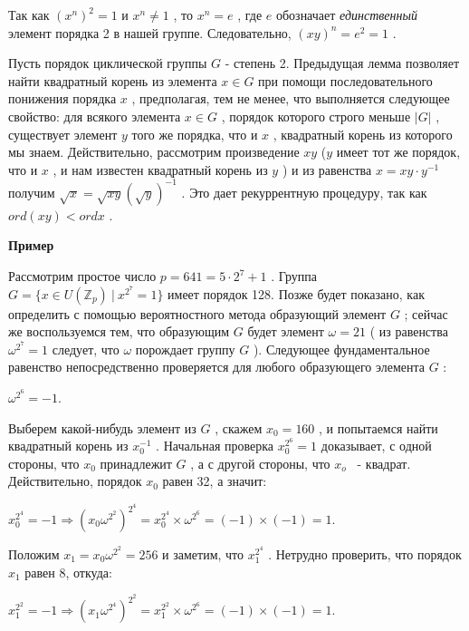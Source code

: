 \documentclass{mai_book}
\begin{document}
\begin{myproof}
Так как $(x^n)^2=1$
 и $x^n\not= 1$
 , то $x^n=e$
, где $e$
 обозначает {\it единственный} элемент порядка 2 в нашей группе. Следовательно, $(xy)^n=e^2=1$
 .
\end{myproof}

\newpage

Пусть порядок циклической группы $G$ - степень 2. Предыдущая лемма позволяет найти квадратный корень из элемента $x\in G$
 при помощи последовательного понижения порядка $x$
 , предполагая, тем не менее, что выполняется следующее свойство: для всякого элемента $x\in G$
, порядок которого строго меньше $|G|$
, существует элемент $y$
того же порядка, что и $x$
, квадратный корень из которого мы знаем. Действительно, рассмотрим произведение $xy$
 ($y$
 имеет тот же порядок, что и $x$
 , и нам известен квадратный корень из $y$
) и из равенства $x=xy\cdot y^{-1}$
 получим $\sqrt x = \sqrt{xy}(\sqrt y)^{-1}$
 . Это дает рекуррентную процедуру, так как $ord(xy)<ord x$
.


{\bf Пример}

Рассмотрим простое число $p=641=5\cdot 2^7+1$
. Группа $G = \{x\in U(\mathbb{Z}_p)\ | \ x^{2^7}=1\}$
 имеет порядок 128. Позже будет показано, как определить с помощью вероятностного метода образующий элемент $G$
 ; сейчас же воспользуемся тем, что образующим $G$
 будет элемент $\omega=21$
 ( из равенства $\omega^{2^7}=1$
 следует, что $\omega$
 порождает группу $G$
 ). Следующее фундаментальное равенство непосредственно проверяется для любого образующего элемента $G$
 :

\begin{center}
$\omega^{2^6}=-1$.
\end{center}


Выберем какой-нибудь элемент из $G$
, скажем $x_0 = 160$
, и попытаемся найти квадратный корень из $x_0^{-1}$
. Начальная проверка $x_0^{2^6} = 1$
 доказывает, с одной стороны, что $x_0$
 принадлежит $G$
 , а с другой стороны, что $x_o$
 ~- квадрат. Действительно, порядок $x_0$
 равен 32, а значит:

\begin{center}
$x_0^{2^4}=-1\Rightarrow (x_0\omega^{2^2})^{2^4} = x_0^{2^4}\times\omega^{2^6}=(-1)\times(-1)=1$.
\end{center}


Положим $x_1=x_0\omega^{2^2}=256$
 и заметим, что $x_1^{2^4}$
 . Нетрудно проверить, что порядок $x_1$
 равен 8, откуда:

\begin{center}
$x_1^{2^2}=-1\Rightarrow (x_1\omega^{2^4})^{2^2} = x_1^{2^2}\times\omega^{2^6}=(-1)\times(-1)=1$.
\end{center}
\end{document}
